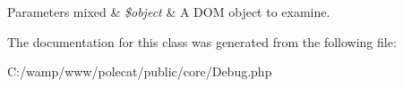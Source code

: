 \begin{DoxyParams}[1]{Parameters}
mixed & {\em \$object} & A D\+O\+M object to examine. \\
\hline
\end{DoxyParams}


The documentation for this class was generated from the following file\+:\begin{DoxyCompactItemize}
\item 
C\+:/wamp/www/polecat/public/core/Debug.\+php\end{DoxyCompactItemize}

